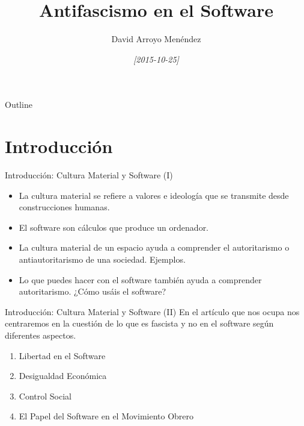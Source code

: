 \documentclass[bigger]{beamer}
\author{David Arroyo Menéndez}
\date{\textit{[2015-10-25]}}
\title{Antifascismo en el Software}
\begin{document}
\maketitle
\begin{frame}{Outline}
\tableofcontents
\end{frame}


\section{Introducción}
\label{sec-1}
\begin{frame}[label=sec-1-1]{Introducción: Cultura Material y Software (I)}
\begin{itemize}
\item La cultura material se refiere a valores e ideología que se transmite desde construcciones humanas.

\item El software son cálculos que produce un ordenador.

\item La cultura material de un espacio ayuda a comprender el autoritarismo o antiautoritarismo de una sociedad. Ejemplos.

\item Lo que puedes hacer con el software también ayuda a comprender autoritarismo. ¿Cómo usáis el software?
\end{itemize}
\end{frame}

\begin{frame}[label=sec-1-2]{Introducción: Cultura Material y Software (II)}
En el artículo que nos ocupa nos centraremos en la cuestión de lo que
es fascista y no en el software según diferentes aspectos.
\begin{enumerate}
\item Libertad en el Software
\item Desigualdad Económica
\item Control Social
\item El Papel del Software en el Movimiento Obrero
\end{enumerate}
\end{frame}
\end{document}
